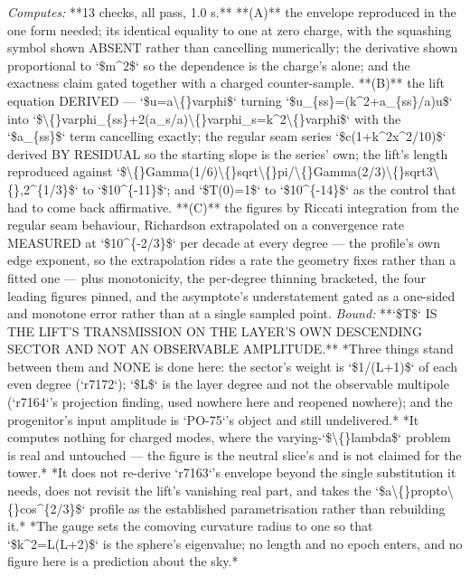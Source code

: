 \begin{description}
\emph{Computes:} **13 checks, all pass, 1.0 s.** **(A)** the envelope reproduced in the one form needed; its identical equality to one at zero charge, with the squashing symbol shown ABSENT rather than cancelling numerically; the derivative shown proportional to `\$m\textasciicircum{}2\$` so the dependence is the charge's alone; and the exactness claim gated together with a charged counter-sample. **(B)** the lift equation DERIVED --- `\$u=a\textbackslash\{\}varphi\$` turning `\$u\_\{ss\}=(k\textasciicircum{}2+a\_\{ss\}/a)u\$` into `\$\textbackslash\{\}varphi\_\{ss\}+2(a\_s/a)\textbackslash\{\}varphi\_s=k\textasciicircum{}2\textbackslash\{\}varphi\$` with the `\$a\_\{ss\}\$` term cancelling exactly; the regular seam series `\$c(1+k\textasciicircum{}2x\textasciicircum{}2/10)\$` derived BY RESIDUAL so the starting slope is the series' own; the lift's length reproduced against `\$\textbackslash\{\}Gamma(1/6)\textbackslash\{\}sqrt\textbackslash\{\}pi/\textbackslash\{\}Gamma(2/3)\textbackslash\{\}sqrt3\textbackslash\{\},2\textasciicircum{}\{1/3\}\$` to `\$10\textasciicircum{}\{-11\}\$`; and `\$T(0)=1\$` to `\$10\textasciicircum{}\{-14\}\$` as the control that had to come back affirmative. **(C)** the figures by Riccati integration from the regular seam behaviour, Richardson extrapolated on a convergence rate MEASURED at `\$10\textasciicircum{}\{-2/3\}\$` per decade at every degree --- the profile's own edge exponent, so the extrapolation rides a rate the geometry fixes rather than a fitted one --- plus monotonicity, the per-degree thinning bracketed, the four leading figures pinned, and the asymptote's understatement gated as a one-sided and monotone error rather than at a single sampled point.
 \emph{Bound:}  **`\$T\$` IS THE LIFT'S TRANSMISSION ON THE LAYER'S OWN DESCENDING SECTOR AND NOT AN OBSERVABLE AMPLITUDE.** *Three things stand between them and NONE is done here: the sector's weight is `\$1/(L+1)\$` of each even degree (`r7172`); `\$L\$` is the layer degree and not the observable multipole (`r7164`'s projection finding, used nowhere here and reopened nowhere); and the progenitor's input amplitude is `PO-75`'s object and still undelivered.*  *It computes nothing for charged modes, where the varying-`\$\textbackslash\{\}lambda\$` problem is real and untouched --- the figure is the neutral slice's and is not claimed for the tower.*  *It does not re-derive `r7163`'s envelope beyond the single substitution it needs, does not revisit the lift's vanishing real part, and takes the `\$a\textbackslash\{\}propto\textbackslash\{\}cos\textasciicircum{}\{2/3\}\$` profile as the established parametrisation rather than rebuilding it.*  *The gauge sets the comoving curvature radius to one so that `\$k\textasciicircum{}2=L(L+2)\$` is the sphere's eigenvalue; no length and no epoch enters, and no figure here is a prediction about the sky.*

\end{description}
